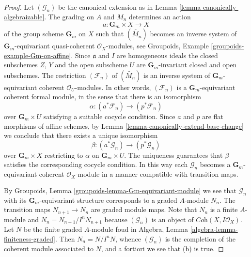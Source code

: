 \documentclass{stacks-project}
\theoremstyle{plain}
\theoremstyle{definition}
\theoremstyle{remark}
\numberwithin{equation}{subsection}
\begin{document}
\begin{proof}
Let $(\mathcal{G}_n)$ be the canonical extension as in
Lemma \ref{lemma-canonically-algebraizable}.
The grading on $A$ and $M_n$ determines an action
$$
a : \mathbf{G}_m \times X \longrightarrow X
$$
of the group scheme $\mathbf{G}_m$ on $X$ such that
$(\widetilde{M_n})$ becomes an inverse system of
$\mathbf{G}_m$-equivariant quasi-coherent $\mathcal{O}_X$-modules, see
Groupoids, Example \ref{groupoids-example-Gm-on-affine}.
Since $\mathfrak a$ and $I$ are homogeneous ideals
the closed subschemes $Z$, $Y$ and the open subscheme $U$
are $\mathbf{G}_m$-invariant closed and open subschemes.
The restriction $(\mathcal{F}_n)$ of $(\widetilde{M_n})$
is an inverse system of $\mathbf{G}_m$-equivariant
coherent $\mathcal{O}_U$-modules. In other words, $(\mathcal{F}_n)$
is a $\mathbf{G}_m$-equivariant coherent formal module,
in the sense that there is an isomorphism
$$
\alpha : (a^*\mathcal{F}_n) \longrightarrow (p^*\mathcal{F}_n)
$$
over $\mathbf{G}_m \times U$ satisfying a suitable cocycle condition.
Since $a$ and $p$ are flat morphisms of affine schemes,
by Lemma \ref{lemma-canonically-extend-base-change}
we conclude that there exists a unique isomorphism
$$
\beta : (a^*\mathcal{G}_n) \longrightarrow (p^*\mathcal{G}_n)
$$
over $\mathbf{G}_m \times X$ restricting to $\alpha$ on
$\mathbf{G}_m \times U$. The uniqueness guarantees that
$\beta$ satisfies the corresponding cocycle condition.
In this way each $\mathcal{G}_n$ becomes
a $\mathbf{G}_m$-equivariant coherent $\mathcal{O}_X$-module
in a manner compatible with transition maps.

\medskip\noindent
By Groupoids, Lemma \ref{groupoids-lemma-Gm-equivariant-module}
we see that $\mathcal{G}_n$ with its $\mathbf{G}_m$-equivariant
structure corresponds to a graded $A$-module $N_n$. The transition maps
$N_{n + 1} \to N_n$ are graded module maps. Note that $N_n$ is a finite
$A$-module and $N_n = N_{n + 1}/I^n N_{n + 1}$ because
$(\mathcal{G}_n)$ is an object of $\textit{Coh}(X, I\mathcal{O}_X)$.
Let $N$ be the finite graded $A$-module foud in
Algebra, Lemma \ref{algebra-lemma-finiteness-graded}.
Then $N_n = N/I^nN$, whence $(\mathcal{G}_n)$
is the completion of the coherent module
associated to $N$, and a fortiori we see that (b) is true.


\end{proof}
\end{document}
